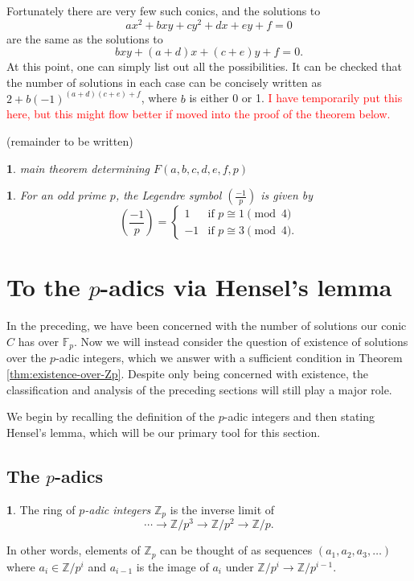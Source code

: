 \documentclass[10pt,a4paper]{amsart}
\numberwithin{equation}{section}
\numberwithin{figure}{section}
\theoremstyle{definition}
\theoremstyle{remark}
\theoremstyle{plain}
\newtheorem{thm}{\protect\theoremname}[section]
\theoremstyle{plain}
\theoremstyle{definition}
\newtheorem{defn}{\protect\definitionname}[section]
\theoremstyle{plain}
\newtheorem{prop}{\protect\propositionname}[section]
\theoremstyle{plain}
\providecommand{\definitionname}{Definition}
\providecommand{\propositionname}{Proposition}
\providecommand{\theoremname}{Theorem}
\newcommand{\legendre}[2]{\genfrac{(}{)}{}{}{#1}{#2}}
\newcommand{\F}{\mathbb{F}}
\newcommand{\Z}{\mathbb{Z}}
\begin{document}
    Fortunately there are very few such conics, and the solutions to 
    \[ ax^2 + bxy + cy^2 + dx + ey + f = 0 \] 
    are the same as the solutions to 
    \[ bxy + (a+d)x + (c+e)y + f = 0.  \] 
    At this point, one can simply list out all the
    possibilities. It can be checked that the number of solutions in each case can
    be concisely written as $2 + b(-1)^{(a+d)(c+e) + f}$, where $b$ is either 0 or
    1. \textcolor{red}{I have temporarily put this here, but this might flow better
    if moved into the proof of the theorem below. }

    (remainder to be written)

    \begin{thm} 
        main theorem determining $F(a,b,c,d,e,f,p)$ 
    \end{thm}

    \begin{prop} 
        For an odd prime $p$, the Legendre symbol $\legendre{-1}{p}$ is
        given by 
        \[ \legendre{-1}{p} = \begin{cases} 
            1 & \text{if } p \cong 1 \pmod 4 \\ 
            -1 & \text{if } p \cong 3 \pmod 4.  
        \end{cases} \]
    \end{prop}

    \section{To the $p$-adics via Hensel's lemma}
	In the preceding, we have been concerned with the number of solutions our conic $C$ has over $\F_p$. Now we will instead consider the question of existence of solutions over the $p$-adic integers, which we answer with a sufficient condition in Theorem \ref{thm:existence-over-Zp}. Despite only being concerned with existence, the classification and analysis of the preceding sections will still play a major role.
	
	We begin by recalling the definition of the $p$-adic integers and then stating Hensel's lemma, which will be our primary tool for this section.
	\subsection{The $p$-adics}
	\begin{defn}
		The ring of \emph{$p$-adic integers} $\Z_p$ is the inverse limit of
		\[
		\cdots \to \Z/p^3 \to \Z/p^2 \to \Z/p.
		\]
	\end{defn}
	In other words, elements of $\Z_p$ can be thought of as sequences $(a_1,a_2,a_3,\ldots)$ where $a_i \in \Z/p^i$ and $a_{i-1}$ is the image of $a_i$ under $\Z/p^i \to \Z/p^{i-1}$.
	
\end{document}
